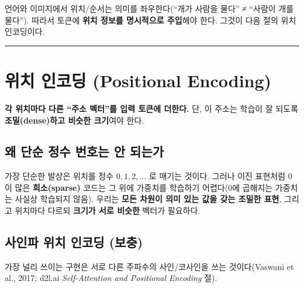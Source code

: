 \documentclass[
  korean,
]{article}
\begin{document}
언어와 이미지에서 위치/순서는 의미를 좌우한다(``개가 사람을 물다'' ≠
``사람이 개를 물다''). 따라서 토큰에 \textbf{위치 정보를 명시적으로
주입}해야 한다. 그것이 다음 절의 위치 인코딩이다.

\begin{center}\rule{0.5\linewidth}{0.5pt}\end{center}

\section{위치 인코딩 (Positional Encoding)}\label{sec-pe}

\begin{tcolorbox}[enhanced jigsaw, arc=.35mm, bottomrule=.15mm, bottomtitle=1mm, breakable, colback=white, colbacktitle=quarto-callout-tip-color!10!white, colframe=quarto-callout-tip-color-frame, coltitle=black, left=2mm, leftrule=.75mm, opacityback=0, opacitybacktitle=0.6, rightrule=.15mm, title=\textcolor{quarto-callout-tip-color}{\faLightbulb}\hspace{0.5em}{핵심 한 줄}, titlerule=0mm, toprule=.15mm, toptitle=1mm]

\textbf{각 위치마다 다른 ``주소 벡터''를 입력 토큰에 더한다.} 단, 이
주소는 학습이 잘 되도록 \textbf{조밀(dense)하고 비슷한 크기}여야 한다.

\end{tcolorbox}

\subsection{왜 단순 정수 번호는 안
되는가}\label{uxc65c-uxb2e8uxc21c-uxc815uxc218-uxbc88uxd638uxb294-uxc548-uxb418uxb294uxac00}

가장 단순한 발상은 위치를 정수 \(0,1,2,\dots\) 로 매기는 것이다. 그러나
이진 표현처럼 0이 많은 \textbf{희소(sparse)} 코드는 그 위에 가중치를
학습하기 어렵다(0에 곱해지는 가중치는 사실상 학습되지 않음). 우리는
\textbf{모든 차원이 의미 있는 값을 갖는 조밀한 표현}, 그리고 위치마다
다르되 \textbf{크기가 서로 비슷한} 벡터가 필요하다.

\subsection{사인파 위치 인코딩
(보충)}\label{uxc0acuxc778uxd30c-uxc704uxce58-uxc778uxcf54uxb529-uxbcf4uxcda9}

가장 널리 쓰이는 구현은 서로 다른 주파수의 사인/코사인을 쓰는
것이다(Vaswani et al., 2017; d2l.ai \emph{Self-Attention and Positional
Encoding} 절).
\end{document}
